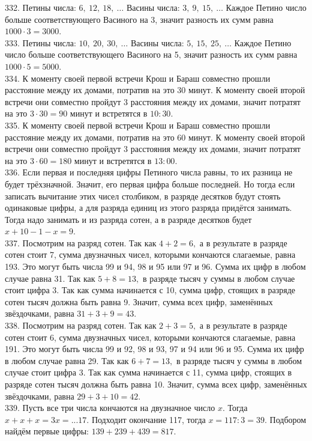 \documentclass[12pt]{article}
\begin{document}
332. Петины числа: $6,\ 12,\ 18,\ \ldots$ Васины числа: $3,\ 9,\ 15,\ \ldots$ Каждое Петино число больше соответствующего Васиного на 3, значит разность их сумм равна $1000\cdot3=3000.$\\
333. Петины числа: $10,\ 20,\ 30,\ \ldots$ Васины числа: $5,\ 15,\ 25,\ \ldots$ Каждое Петино число больше соответствующего Васиного на 5, значит разность их сумм равна $1000\cdot5=5000.$\\
334. К моменту своей первой встречи Крош и Бараш совместно прошли расстояние между их домами, потратив на это 30 минут. К моменту своей второй встречи они совместно пройдут 3 расстояния между их домами, значит потратят на это $3\cdot30=90$ минут и встретятся в $10:30.$\\
335. К моменту своей первой встречи Крош и Бараш совместно прошли расстояние между их домами, потратив на это 60 минут. К моменту своей второй встречи они совместно пройдут 3 расстояния между их домами, значит потратят на это $3\cdot60=180$ минут и встретятся в $13:00.$\\
336. Если первая и последняя цифры Петиного числа равны, то их разница не будет трёхзначной. Значит, его первая цифра больше последней. Но тогда если записать вычитание этих чисел столбиком, в разряде десятков будут стоять одинаковые цифры, а для разряда единиц из этого разряда придётся занимать. Тогда надо занимать и из разряда сотен, а в разряде десятков будет $x+10-1-x=9.$\\
337. Посмотрим на разряд сотен. Так как $4+2=6,$ а в результате в разряде сотен стоит 7, сумма двузначных чисел, которыми кончаются слагаемые, равна 193. Это могут быть числа 99 и 94, 98 и 95 или 97 и 96. Сумма их цифр в любом случае равна 31. Так как $5+8=13,$ в разряде тысяч у суммы в любом случае стоит цифра 3. Так как сумма начинается с 10, сумма цифр, стоящих в разряде сотен тысяч должна быть равна 9. Значит, сумма всех цифр, заменённых звёздочками, равна $31+3+9=43.$\\
338. Посмотрим на разряд сотен. Так как $2+3=5,$ а в результате в разряде сотен стоит 6, сумма двузначных чисел, которыми кончаются слагаемые, равна 191. Это могут быть числа 99 и 92, 98 и 93, 97 и 94 или 96 и 95. Сумма их цифр в любом случае равна 29. Так как $6+7=13,$ в разряде тысяч у суммы в любом случае стоит цифра 3. Так как сумма начинается с 11, сумма цифр, стоящих в разряде сотен тысяч должна быть равна 10. Значит, сумма всех цифр, заменённых звёздочками, равна $29+3+10=42.$\\
339. Пусть все три числа кончаются на двузначное число $x.$ Тогда $x+x+x=3x=...17.$ Подходит окончание 117, тогда $x=117:3=39.$ Подбором найдём первые цифры: $139+239+439=817.$\\
\end{document}
